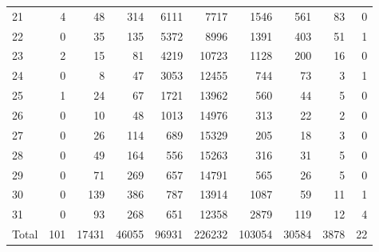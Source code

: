 \begin{table}
\begin{tabular}{lrrrrrrrrr}
21 & 4 & 48 & 314 & 6111 & 7717 & 1546 & 561 & 83 & 0 \\
22 & 0 & 35 & 135 & 5372 & 8996 & 1391 & 403 & 51 & 1 \\
23 & 2 & 15 & 81 & 4219 & 10723 & 1128 & 200 & 16 & 0 \\
24 & 0 & 8 & 47 & 3053 & 12455 & 744 & 73 & 3 & 1 \\
25 & 1 & 24 & 67 & 1721 & 13962 & 560 & 44 & 5 & 0 \\
26 & 0 & 10 & 48 & 1013 & 14976 & 313 & 22 & 2 & 0 \\
27 & 0 & 26 & 114 & 689 & 15329 & 205 & 18 & 3 & 0 \\
28 & 0 & 49 & 164 & 556 & 15263 & 316 & 31 & 5 & 0 \\
29 & 0 & 71 & 269 & 657 & 14791 & 565 & 26 & 5 & 0 \\
30 & 0 & 139 & 386 & 787 & 13914 & 1087 & 59 & 11 & 1 \\
31 & 0 & 93 & 268 & 651 & 12358 & 2879 & 119 & 12 & 4 \\
Total & 101 & 17431 & 46055 & 96931 & 226232 & 103054 & 30584 & 3878 & 22 \\
\end{tabular}
\end{table}
